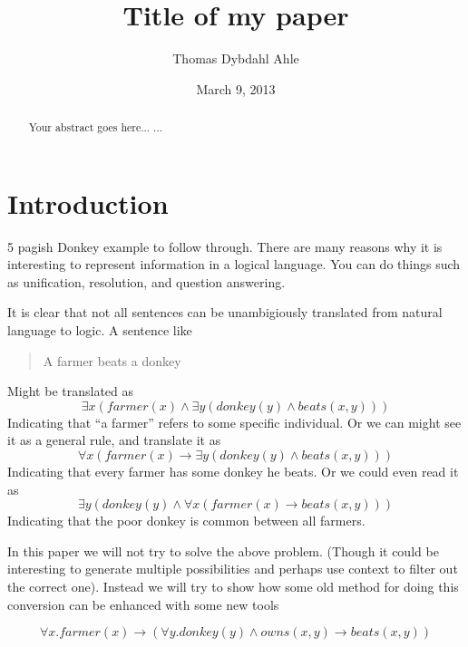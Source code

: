 \documentclass[12pt]{article}
\title{Title of my paper}
\author{Thomas Dybdahl Ahle}
\date{March 9, 2013}
\let\stdsection\section
\renewcommand\section{\newpage\stdsection}
\begin{document}
\maketitle

\begin{abstract}
Your abstract goes here...
...
\end{abstract}

\tableofcontents

\section{Introduction}
5 pagish Donkey example to follow through. There are many reasons why it is interesting to represent information in a logical language. You can do things such as unification, resolution, and question answering.

It is clear that not all sentences can be unambigiously translated from natural language to logic. A sentence like 	
\begin{quotation}
A farmer beats a donkey
\end{quotation}
Might be translated as 
\begin{equation}
\exists x ( farmer(x) \wedge \exists y ( donkey(y) \wedge beats(x,y)))
\end{equation}
Indicating that ``a farmer'' refers to some specific individual. Or we can might see it as a general rule, and translate it as
\begin{equation}
\forall x ( farmer(x) \rightarrow \exists y ( donkey(y) \wedge beats(x,y)))
\end{equation}
Indicating that every farmer has some donkey he beats. Or we could even read it as
\begin{equation}
\exists y ( donkey(y) \wedge \forall x ( farmer(x) \rightarrow beats(x,y)))
\end{equation}
Indicating that the poor donkey is common between all farmers.

In this paper we will not try to solve the above problem. (Though it could be interesting to generate multiple possibilities and perhaps use context to filter out the correct one). Instead we will try to show how some old method for doing this conversion can be enhanced with some new tools

\begin{equation}
\forall x . farmer(x) \rightarrow (\forall y . donkey(y) \wedge owns(x,y) \rightarrow beats(x,y))
\end{equation}
\end{document}
